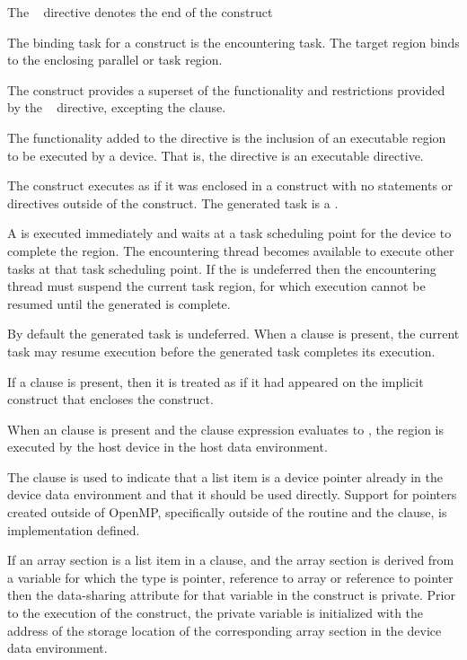 The ~ directive denotes the end of the  construct
\fortranspecificend

\binding
The binding task for a  construct is the encountering task. The target region 
binds to the enclosing parallel or task region.

\descr
The  construct provides a superset of the functionality and
restrictions provided by the ~ directive, excepting
the  clause.

The functionality added to the  directive is the inclusion of an executable region to be executed by a device. That is, the  directive is an executable directive.

The  construct executes as if it was enclosed in a  construct with no statements or directives outside of the  construct. The generated task is a .

A  is executed immediately and waits at a task scheduling point for the device to complete the  region. The encountering thread becomes available to execute other tasks at that task scheduling point. If the  is undeferred then the encountering thread must suspend the current task region, for which execution cannot be resumed until the generated  is complete.

By default the generated task is undeferred. When a  clause is present, the current task may resume execution before the generated task completes its execution.

If a  clause is present, then it is treated as if it had appeared on the implicit  construct that encloses the  construct.

When an  clause is present and the  clause expression evaluates to , the  region is executed by the host device in the host data environment.

The  clause is used to indicate that a list item is a device
pointer already in the device data environment and that it should be used
directly.  Support for pointers created outside of OpenMP, specifically
outside of the  routine and the  clause,
is implementation defined.

\ccppspecificstart
If an array section is a list item in a  clause, and the array section is derived from a variable for which the type is pointer, reference to array or reference to pointer then the data-sharing attribute for that variable in the construct is private.  Prior to the execution of the construct, the private variable is initialized with the address of the storage location of the corresponding array section in the device data environment.
\ccppspecificend

